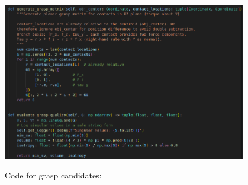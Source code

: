 \documentclass[12pt]{article}
\begin{document}
\begin{center}
	\includegraphics[width=0.8\textwidth]{graspmatrixcode.png}
\end{center}

Code for grasp candidates:
\end{document}
